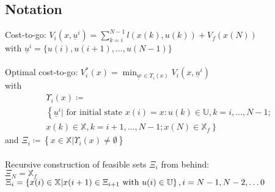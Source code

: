 \documentclass[english]{latex4ei/latex4ei_sheet}
\begin{document}
\begin{sectionbox}
\subsection{Notation}
Cost-to-go: $V_{i}\left(x, \underline{u}^{i}\right)=\sum\limits_{k=i}^{N-1} l(x(k), u(k))+V_{f}(x(N))$ \\
with $\underline{u}^{i}=\{u(i), u(i+1), \ldots, u(N-1)\}$ \\ \\
Optimal cost-to-go: $V_{i}^{*}(x)=\min _{\underline{u}^{i} \in \Upsilon_{i}(x)} V_{i}\left(x, \underline{u}^{i}\right)$ \\
with
\begin{multline*} \Upsilon_{i}(x)\coloneqq\\\left\{\underline{u}^{i} | \text { for initial state } x(i)=x: u(k) \in \mathbb{U}, k=i, \ldots, N-1;\right.\\\left.x(k) \in \mathbb{X}, k=i+1, \ldots, N-1 ; x(N) \in \mathbb{X}_{f}\right\} 
\end{multline*}
and $\Xi_{i}\coloneqq\left\{x \in \mathbb{X} | \Upsilon_{i}(x) \neq \emptyset\right\}$ \\
\\
Recursive construction of feasible sets $\Xi_{i}$ from behind:\\ 
$\Xi_{N}=\mathbb{X}_{f}$ \\ 
$\Xi_{i}=\left\{x(i) \in \mathbb{X} | x(i+1) \in \Xi_{i+1} \text { with } u(i) \in \mathbb{U}\right\},\\
i=N-1, N-2, \ldots 0$\\

\end{sectionbox}
\end{document}
